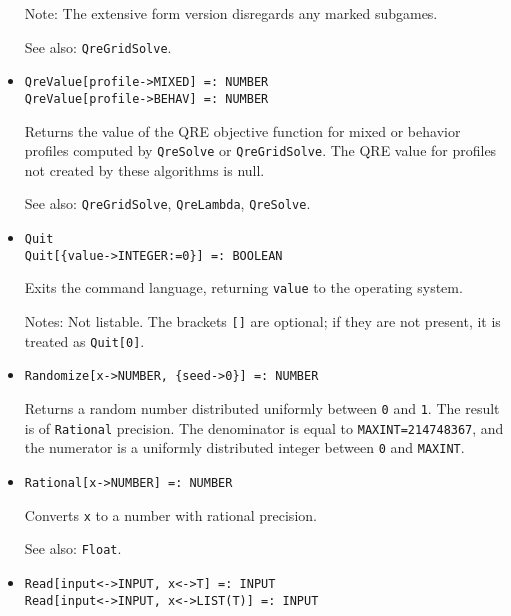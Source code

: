 \begin{itemize}
\item
[Note:] The extensive form version disregards any marked
subgames.
\item [See also:] \verb+QreGridSolve+.
\ed

\item{}
\protect \large \begin{verbatim}
QreValue[profile->MIXED] =: NUMBER 
QreValue[profile->BEHAV] =: NUMBER 
\end{verbatim}\normalsize

\bd
Returns the value of the QRE objective function for mixed or behavior
profiles computed by \verb+QreSolve+ or \verb+QreGridSolve+.  The QRE
value for profiles not created by these algorithms is null.
\item
[See also:] \verb+QreGridSolve+, \verb+QreLambda+, \verb+QreSolve+.
\ed

\item{}
\protect \large \begin{verbatim}
Quit
Quit[{value->INTEGER:=0}] =: BOOLEAN
\end{verbatim}\normalsize

\bd
Exits the command language, returning \verb+value+ to the operating system.
\item [Notes:] Not listable.  The brackets \verb+[]+ are optional; if they
are not present, it is treated as \verb+Quit[0]+.
\ed


\item{}
\protect \large \begin{verbatim}
Randomize[x->NUMBER, {seed->0}] =: NUMBER
\end{verbatim}\normalsize

\bd 
Returns a random number distributed uniformly between \verb+0+ and
\verb+1+.  The result is of \verb+Rational+ precision.  The
denominator is equal to \verb+MAXINT=214748367+, and the numerator is
a uniformly distributed integer between \verb+0+ and \verb+MAXINT+.
\ed

\item{}
\protect \large \begin{verbatim}
Rational[x->NUMBER] =: NUMBER
\end{verbatim}\normalsize

\bd
Converts \verb+x+ to a number with rational precision.
\item [See also:] \verb+Float+.
\ed

\item{}
\protect \large \begin{verbatim}
Read[input<->INPUT, x<->T] =: INPUT 
Read[input<->INPUT, x<->LIST(T)] =: INPUT
\end{verbatim}\normalsize


\end{itemize}
